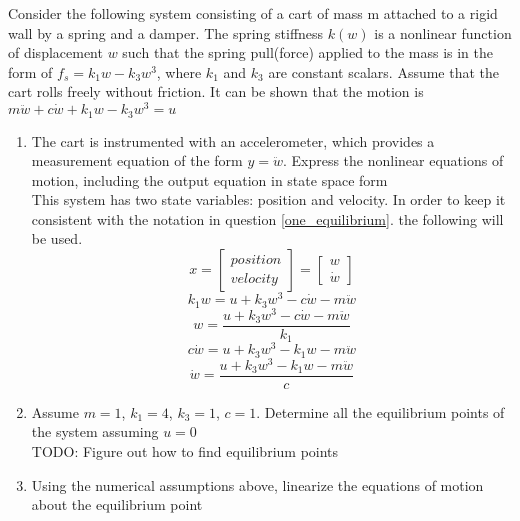 
\item Consider the following system consisting of a cart of mass m attached to a rigid wall by a spring and a
damper. The spring stiffness $k(w)$ is a nonlinear function of displacement $w$ such that the spring pull(force)
applied to the mass is in the form of $f_s = k_1w - k_3w^3$, where $k_1$ and $k_3$ are constant scalars. Assume
that the cart rolls freely without friction. It can be shown that the motion is
$m\ddot w + c\dot w + k_1w - k_3w^3 = u$
\begin{enumerate}
\item The cart is instrumented with an accelerometer, which provides a measurement equation of the form
  $y = \ddot w$. Express the nonlinear equations of motion, including the output equation in state space form\\
  This system has two state variables: position and velocity. In order to keep it consistent with the notation
  in question \ref{one_equilibrium}. the following will be used.
  \begin{equation}
    x =
    \begin{bmatrix}
      position \\
      velocity
    \end{bmatrix} =
    \begin{bmatrix}
      w \\
      \dot w
    \end{bmatrix}
  \end{equation}
  \begin{equation}
    k_1w = u + k_3w^3 - c \dot w - m \ddot w
  \end{equation}
  \begin{equation}
    w = \frac{u + k_3w^3 - c \dot w - m \ddot w}{k_1}
  \end{equation}
  \begin{equation}
    c\dot w = u + k_3w^3 - k_1w - m \ddot w
  \end{equation}
  \begin{equation}
    \dot w = \frac{u + k_3w^3 - k_1w - m \ddot w}{c}
  \end{equation}
\item Assume $m = 1$, $k_1 = 4$,
  $k_3 = 1$, $c = 1$. Determine all the
  equilibrium points of the system assuming $u = 0$ \\
  {\LARGE \color{red} TODO: Figure out how to find equilibrium points}
\item Using the numerical assumptions above, linearize the equations of motion about the equilibrium point

\end{enumerate}
